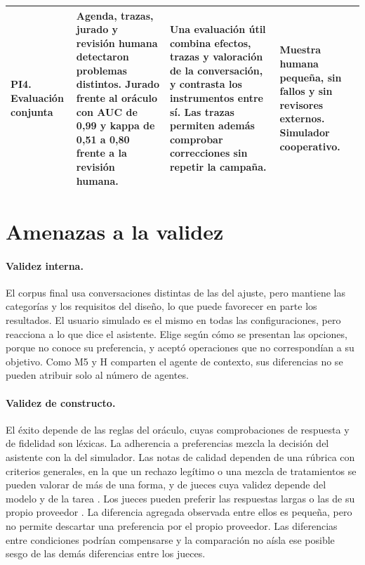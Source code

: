\begin{table}[!htbp]
\begin{tabularx}{\textwidth}{L{0.1\textwidth}YYY}
PI4. Evaluación conjunta & Agenda, trazas, jurado y revisión humana detectaron problemas distintos. Jurado frente al oráculo con AUC de 0,99 y kappa de 0,51 a 0,80 frente a la revisión humana. & Una evaluación útil combina efectos, trazas y valoración de la conversación, y contrasta los instrumentos entre sí. Las trazas permiten además comprobar correcciones sin repetir la campaña. & Muestra humana pequeña, sin fallos y sin revisores externos. Simulador cooperativo. \\
\bottomrule
\end{tabularx}
\end{table}

\FloatBarrier
\section{Amenazas a la validez}
\label{sec:discusion-amenazas}

\paragraph{Validez interna.}
El corpus final usa conversaciones distintas de las del ajuste, pero mantiene
las categorías y los requisitos del diseño, lo que puede favorecer en parte los
resultados. El usuario simulado es el mismo en todas las configuraciones, pero
reacciona a lo que dice el asistente. Elige según cómo se presentan las
opciones, porque no conoce su preferencia, y aceptó operaciones que no
correspondían a su objetivo. Como M5 y H comparten el agente de contexto, sus
diferencias no se pueden atribuir solo al número de agentes.

\paragraph{Validez de constructo.}
El éxito depende de las reglas del oráculo, cuyas comprobaciones de respuesta y
de fidelidad son léxicas. La adherencia a preferencias mezcla la decisión del
asistente con la del simulador. Las notas de calidad dependen de una rúbrica
con criterios generales, en la que un rechazo legítimo o una mezcla de
tratamientos se pueden valorar de más de una forma, y de jueces cuya validez
depende del modelo y de la tarea \citep{bavaresco2025judgebench,gu2024judgesurvey}.
Los jueces pueden preferir las respuestas largas o las de su propio proveedor
\citep{zheng2023llmjudge,panickssery2024selfpreference}. La diferencia agregada
observada entre ellos es pequeña, pero no permite descartar una preferencia por
el propio proveedor. Las diferencias entre condiciones podrían compensarse y
la comparación no aísla ese posible sesgo de las demás diferencias entre los
jueces.

